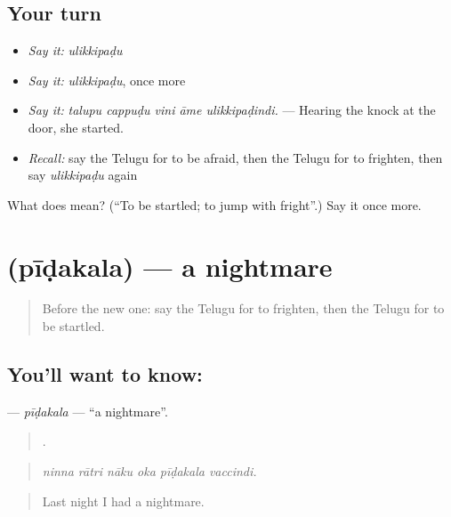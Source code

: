 \subsection*{Your turn}
\begin{itemize}
\raggedright
  \item \emph{Say it:} \emph{ulikkipaḍu}
  \item \emph{Say it:} \emph{ulikkipaḍu}, once more
  \item \emph{Say it:} \emph{talupu cappuḍu vini āme ulikkipaḍindi.} — Hearing the knock at the door, she started.
  \item \emph{Recall:} say the Telugu for to be afraid, then the Telugu for to frighten, then say \emph{ulikkipaḍu} again
\end{itemize}

\begin{tcolorbox}[breakable,colback=teal!4,colframe=teal!35!black,title={Before you move on}]
What does  mean? (\textquotedblleft{}To be startled; to jump with fright\textquotedblright{}.) Say it once more.
\end{tcolorbox}
\section[\texorpdfstring{\te{పీడకల} (pīḍakala)}{పీడకల (pīḍakala)}]{ (pīḍakala) — a nightmare}

\label{lesson:TE-C495-pidakala}



\begin{quote}
Before the new one: say the Telugu for to frighten, then the Telugu for to be startled.
\end{quote}

\subsection*{You'll want to know: }
\textbf{} — \emph{pīḍakala} — \textquotedblleft{}a nightmare\textquotedblright{}.

\begin{quote}
     .
\end{quote}

\begin{quote}
\emph{ninna rātri nāku oka pīḍakala vaccindi.}
\end{quote}

\begin{quote}
Last night I had a nightmare.
\end{quote}

